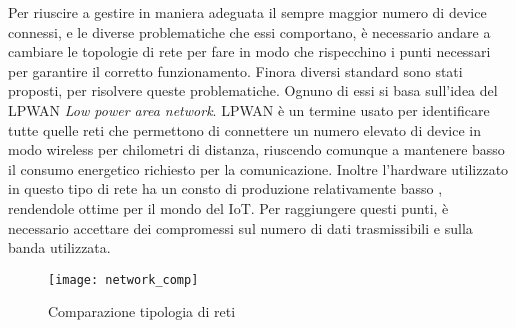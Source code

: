 Per riuscire a gestire in maniera adeguata il sempre maggior numero di device
connessi, e le diverse problematiche che essi comportano, è necessario andare a
cambiare le topologie di rete per fare in modo che rispecchino i punti necessari
per garantire il corretto funzionamento. Finora diversi standard sono stati
proposti, per risolvere queste problematiche. Ognuno di essi si basa sull'idea
del LPWAN \emph{Low power area network}. LPWAN è un termine usato per
identificare tutte quelle reti che permettono di connettere un numero elevato di
device in modo wireless per chilometri di distanza, riuscendo comunque a
mantenere basso il consumo energetico richiesto per la comunicazione. Inoltre
l'hardware utilizzato in questo tipo di rete ha un consto di produzione
relativamente basso , rendendole ottime per il mondo del IoT. Per raggiungere
questi punti, è necessario accettare dei compromessi sul numero di dati
trasmissibili e sulla banda utilizzata. 

\begin{figure}[h]
\centering 
\texttt{[image: network\_comp]}
\caption{Comparazione tipologia di reti}
\end{figure}


